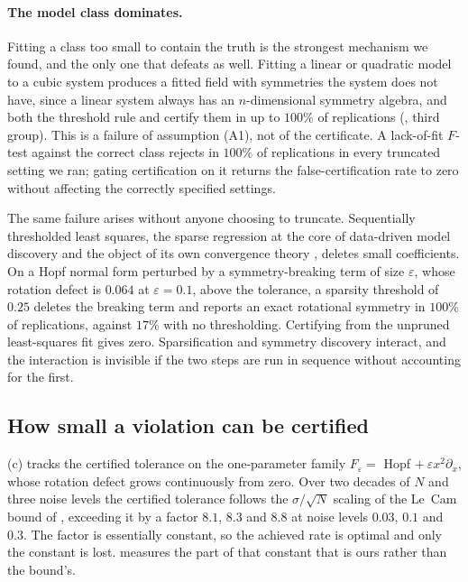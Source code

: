 

\paragraph{The model class dominates.} Fitting a class too small to contain
the truth is the strongest mechanism we found, and the only one that defeats
\symcert{} as well. Fitting a linear or quadratic model to a cubic system
produces a fitted field with symmetries the system does not have, since a
linear system always has an $n$-dimensional symmetry algebra, and both the
threshold rule and \symcert{} certify them in up to $100\%$ of replications
(, third group). This is a failure of assumption (A1),
not of the certificate. A lack-of-fit $F$-test against the correct class
rejects in $100\%$ of replications in every truncated setting we ran; gating
certification on it returns the false-certification rate to zero without
affecting the correctly specified settings.

The same failure arises without anyone choosing to truncate. Sequentially
thresholded least squares, the sparse regression at the core of data-driven
model discovery \citep{brunton2016discovering,champion2020unified,
kaptanoglu2022pysindy} and the object of its own convergence theory
\citep{zhang2019convergence}, deletes small coefficients. On a Hopf normal
form perturbed by a symmetry-breaking term of size $\varepsilon$, whose
rotation defect is $0.064$ at $\varepsilon = 0.1$, above the tolerance, a
sparsity threshold of $0.25$ deletes the breaking term and reports an exact
rotational symmetry in $100\%$ of replications, against $17\%$ with no
thresholding. Certifying from the unpruned least-squares fit gives zero.
Sparsification and symmetry discovery interact, and the interaction is
invisible if the two steps are run in sequence without accounting for the
first.

\subsection{How small a violation can be certified}
\label{sec:resolution}

(c) tracks the certified tolerance on the one-parameter
family $F_\varepsilon = $ Hopf $+\ \varepsilon x^2 \partial_x$, whose rotation
defect grows continuously from zero. Over two decades of $N$ and three noise
levels the certified tolerance follows the $\sigma/\sqrt N$ scaling of the
Le~Cam bound of , exceeding it by a factor $8.1$, $8.3$ and
$8.8$ at noise levels $0.03$, $0.1$ and $0.3$. The factor is essentially
constant, so the achieved rate is optimal and only the constant is lost.
 measures the part of that constant that is ours rather
than the bound's.

